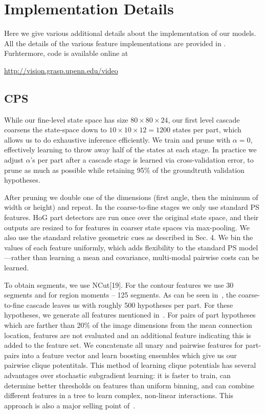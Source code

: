 \section{Implementation Details}\label{sec:impl-details}

Here we give various additional details about the implementation of our models. 
All the details of the various feature implementations are provided in 
. Furhtermore, code is available online at \begin{center} 
\url{http://vision.grasp.upenn.edu/video} \end{center}

\subsection{CPS}
 While our fine-level state space has size $80 
\times 80 \times 24$, our first level cascade coarsens the state-space down to 
$10 \times 10 \times 12 = 1200$ states per part, which allows us to do 
exhaustive inference efficiently.  We train and prune with $\alpha = 0$, 
effectively learning to throw away half of the states at each stage.  In 
practice we adjust $\alpha$'s per part after a cascade stage is learned via 
cross-validation error, to prune as much as possible while retaining 95\% of 
the groundtruth validation hypotheses.

After pruning we double one of the dimensions (first angle, then the minimum of 
width or height) and repeat. In the coarse-to-fine stages we only use standard 
PS features.  HoG part detectors are run once over the original state space, 
and their outputs are resized to for features in coarser state spaces via 
max-pooling.  We also use the standard relative geometric cues as described in 
Sec.  4. We bin the values of each feature uniformly, which adds flexibility to 
the standard PS model—rather than learning a mean and covariance, multi-modal 
pairwise costs can be learned.

 To obtain segments, we use NCut[19]. For the contour 
features we use 30 segments and for region moments – 125 segments.  As can be 
seen in~, the coarse-to-fine cascade leaves us with roughly 500 
hypotheses per part.  For these hypotheses, we generate all features mentioned 
in~.  For pairs of part hypotheses which are farther than 20\% 
of the image dimensions from the mean connection location, features are not 
evaluated and an additional feature indicating this is added to the feature 
set.  We concatenate all unary and pairwise features for part-pairs into a 
feature vector and learn boosting ensembles which give us our pairwise clique 
potentitals.  This method of learning clique potentials has several advantages 
over stochastic subgradient learning: it is faster to train, can determine 
better thresholds on features than uniform binning, and can combine different 
features in a tree to learn complex, non-linear interactions.  This approach is 
also a major selling point of~\citet{dtf2011}.

